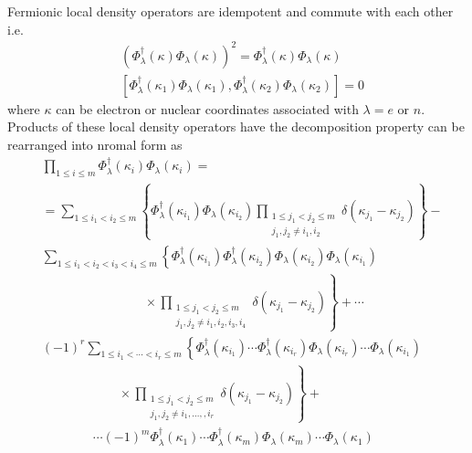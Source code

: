 \documentclass[aps,preprint]{revtex4}%
\begin{document}
Fermionic local density operators are idempotent and commute with each other
i.e.
\begin{align}
&  \left(  \Phi_{\lambda}^{\dagger}(\kappa)\Phi_{\lambda}(\kappa)\right)
^{2}=\Phi_{\lambda}^{\dagger}(\kappa)\Phi_{\lambda}(\kappa)\nonumber\\
&  \left[  \Phi_{\mathcal{\lambda}}^{\dagger}(\kappa_{1})\Phi
_{\mathcal{\lambda}}(\kappa_{1}),\Phi_{\mathcal{\lambda}}^{\dagger}(\kappa
_{2})\Phi_{\mathcal{\lambda}}(\kappa_{2})\right]  =0
\end{align}
where $\kappa$ can be electron or nuclear coordinates associated with
$\lambda=e$ or $n$. Products of these local density operators have the
decomposition property can be rearranged into nromal form as
\begin{align}
&  \prod_{1\leq i\leq m}\Phi_{\mathcal{\lambda}}^{\dagger}(\kappa_{i}%
)\Phi_{\mathcal{\lambda}}(\kappa_{i})=\nonumber\\
&  =\sum_{1\leq i_{1}<i_{2}\leq m}\left\{  \Phi_{\mathcal{\lambda}}^{\dagger
}(\kappa_{i_{1}})\Phi_{\mathcal{\lambda}}(\kappa_{i_{2}})\prod
_{\substack{1\leq j_{1}<j_{2}\leq m \\j_{1},j_{2}\neq i_{1},i_{2} }}
\delta\left(  \kappa_{j_{1}}-\kappa_{j_{2}}\right)  \right\}  -\nonumber\\
&  \sum_{1\leq i_{1}<i_{2}<i_{3}<i_{4}\leq m}\left\{  \Phi_{\mathcal{\lambda}%
}^{\dagger}(\kappa_{i_{1}})\Phi_{\mathcal{\lambda}}^{\dagger}(\kappa_{i_{2}%
})\Phi_{\mathcal{\lambda}}(\kappa_{i_{2}})\Phi_{\mathcal{\lambda}}%
(\kappa_{i_{1}})\right. \nonumber\\
&  \qquad\qquad\qquad\qquad\times\left.  \prod_{\substack{1\leq j_{1}%
<j_{2}\leq m \\j_{1},j_{2}\neq i_{1},i_{2},i_{3},i_{4} }} \delta\left(
\kappa_{j_{1}}-\kappa_{j_{2}}\right)  \right\}  +\cdots\nonumber\\
&  \left(  -1\right)  ^{r}\sum_{1\leq i_{1}<\cdots<i_{r}\leq m}\left\{
\Phi_{\mathcal{\lambda}}^{\dagger}(\kappa_{i_{1}})\cdots\Phi_{\mathcal{\lambda
}}^{\dagger}(\kappa_{i_{r}})\Phi_{\mathcal{\lambda}}(\kappa_{i_{r}})\cdots
\Phi_{\mathcal{\lambda}}(\kappa_{i_{1}})\right. \nonumber\\
&  \qquad\qquad\qquad\times\left.  \prod_{\substack{1\leq j_{1}<j_{2}\leq m
\\j_{1},j_{2}\neq i_{1},\ldots,,i_{r} }} \delta\left(  \kappa_{j_{1}}%
-\kappa_{j_{2}}\right)  \right\}  +\nonumber\\
&  \qquad\qquad\cdots\left(  -1\right)  ^{m}\Phi_{\mathcal{\lambda}}^{\dagger
}(\kappa_{1})\cdots\Phi_{\mathcal{\lambda}}^{\dagger}(\kappa_{m}%
)\Phi_{\mathcal{\lambda}}(\kappa_{m})\cdots\Phi_{\mathcal{\lambda}}(\kappa
_{1}) \label{decomp}%
\end{align}
\end{document}
